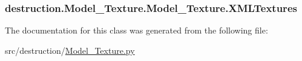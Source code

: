 \hypertarget{classdestruction_1_1_model___texture_1_1_model___texture_a58d8def7a1f442a8a2d5a113f0ac7f70}{
\subsubsection[{X\-M\-L\-Textures}]{\setlength{\rightskip}{0pt plus 5cm}destruction.\-Model\-\_\-\-Texture.\-Model\-\_\-\-Texture.\-X\-M\-L\-Textures}}\label{classdestruction_1_1_model___texture_1_1_model___texture_a58d8def7a1f442a8a2d5a113f0ac7f70}


The documentation for this class was generated from the following file\-:\begin{DoxyCompactItemize}
\item 
src/destruction/\hyperlink{_model___texture_8py}{Model\-\_\-\-Texture.\-py}\end{DoxyCompactItemize}
